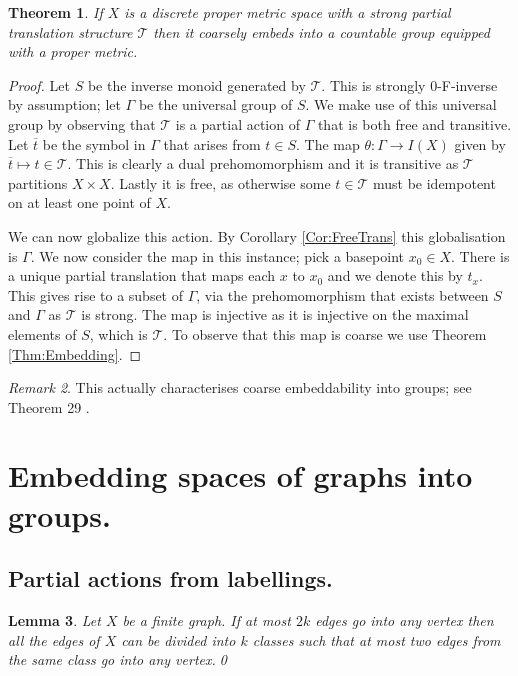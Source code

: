 \documentclass[11pt,a4paper]{amsart}
\theoremstyle{plain}
\newtheorem{theorem}{Theorem}%
\newtheorem{lemma}[theorem]{Lemma}%
\theoremstyle{definition}%
\theoremstyle{remark}%
\newtheorem{remark}[theorem]{Remark}%
\begin{document}
\begin{theorem}\label{Thm:SPTSCE}
If $X$ is a discrete proper metric space with a strong partial translation structure $\mathcal{T}$ then it coarsely embeds into a countable group equipped with a proper metric.
\end{theorem}
\begin{proof}
Let $S$ be the inverse monoid generated by $\mathcal{T}$. This is strongly $0$-F-inverse by assumption; let $\Gamma$ be the universal group of $S$. We make use of this universal group by observing that $\mathcal{T}$ is a partial action of $\Gamma$ that is both free and transitive. Let $\overline{t}$ be the symbol in $\Gamma$ that arises from $t \in S$. The map $\theta: \Gamma \rightarrow I(X)$ given by $\overline{t} \mapsto t \in \mathcal{T}$. This is clearly a dual prehomomorphism and it is transitive as $\mathcal{T}$ partitions $X\times X$. Lastly it is free, as otherwise some $t \in \mathcal{T}$ must be idempotent on at least one point of $X$.

We can now globalize this action. By Corollary \ref{Cor:FreeTrans} this globalisation is $\Gamma$. We now consider the map in this instance; pick a basepoint $x_{0} \in X$. There is a unique partial translation that maps each $x$ to $x_{0}$ and we denote this by $t_{x}$. This gives rise to a subset of $\Gamma$, via the prehomomorphism that exists between $S$ and $\Gamma$ as $\mathcal{T}$ is strong. The map is injective as it is injective on the maximal elements of $S$, which is $\mathcal{T}$. To observe that this map is coarse we use Theorem \ref{Thm:Embedding}.
\end{proof}

\begin{remark}
This actually characterises coarse embeddability into groups; see Theorem 29 \cite{MR2363428}.
\end{remark}

\section{Embedding spaces of graphs into groups.}

\subsection{Partial actions from labellings.}

\begin{lemma}\label{Lem:GenPet}
Let $X$ be a finite graph. If at most $2k$ edges go into any vertex then all the edges of $X$ can be divided into $k$ classes such that at most two edges from the same class go into any vertex.\qed
\end{lemma}
\end{document}
